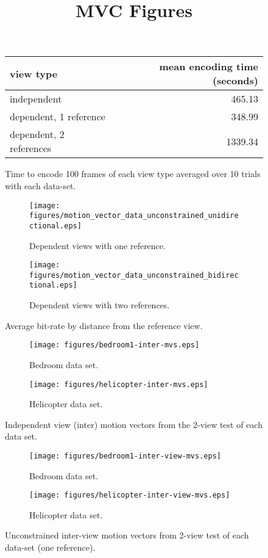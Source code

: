 \documentclass[12pt]{article}
\title{MVC Figures}
\author{}
\begin{document}
\maketitle

\begin{figure}
\centering
\begin{tabular}{|l|r|}
\hline
view type               & mean encoding time (seconds) \\
\hline
independent             & 465.13                       \\
dependent, 1 reference  & 348.99                       \\
dependent, 2 references & 1339.34                      \\
\hline
\end{tabular}
\caption{Time to encode 100 frames of each view type averaged over 10 trials
with each data-set.}
\end{figure}

\begin{figure}
\centering
\begin{subfigure}{\textwidth}
\centering
\texttt{[image: figures/motion\_vector\_data\_unconstrained\_unidirectional.eps]}
\caption{Dependent views with one reference.}
\end{subfigure}
\begin{subfigure}{\textwidth}
\centering
\texttt{[image: figures/motion\_vector\_data\_unconstrained\_bidirectional.eps]}
\caption{Dependent views with two references.}
\end{subfigure}
\caption{Average bit-rate by distance from the reference view.}
\end{figure}

\begin{figure}
\centering
\begin{subfigure}{.5\textwidth}
\centering
\texttt{[image: figures/bedroom1-inter-mvs.eps]}
\caption{Bedroom data set.}
\end{subfigure}
\begin{subfigure}{.5\textwidth}
\centering
\texttt{[image: figures/helicopter-inter-mvs.eps]}
\caption{Helicopter data set.}
\end{subfigure}
\caption{Independent view (inter) motion vectors from the 2-view test of each data set.}
\end{figure}

\begin{figure}
\centering
\begin{subfigure}{.5\textwidth}
\centering
\texttt{[image: figures/bedroom1-inter-view-mvs.eps]}
\caption{Bedroom data set.}
\end{subfigure}
\begin{subfigure}{.5\textwidth}
\centering
\texttt{[image: figures/helicopter-inter-view-mvs.eps]}
\caption{Helicopter data set.}
\end{subfigure}
\caption{Unconstrained inter-view motion vectors from 2-view test of each data-set (one reference).}
\end{figure}
\end{document}
